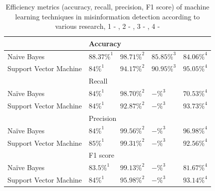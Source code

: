 \documentclass[11pt ,english,a4paper]{article}
\begin{document}
\begin{table}[H]
\centering
\begin{tabular}{lllll}
\cline{2-5}
                       & \multicolumn{4}{|l|}{Accuracy}  \\ [0.5ex]
\hline\hline
\multicolumn{1}{|l|}{Naive Bayes} & \multicolumn{1}{l|}{$88.37\%^{1}$} & \multicolumn{1}{l|}{$98.71\%^{2}$} & \multicolumn{1}{l|}{$85.85\%^{3}$} & \multicolumn{1}{l|}{ $84.06\%^{4}$}\\
\hline
\multicolumn{1}{|l|}{Support Vector Machine}& \multicolumn{1}{l|}{$84\%^{1}$} & \multicolumn{1}{l|}{$94.17\%^{2}$} & \multicolumn{1}{l|}{$90.95\%^{3}$} & \multicolumn{1}{l|}{$95.05\%^{4}$} \\ [1ex]
\hline\hline
\cline{2-5}
                       & \multicolumn{4}{|l|}{Recall}  \\ [0.5ex]
\hline\hline
\multicolumn{1}{|l|}{Naïve Bayes} & \multicolumn{1}{l|}{$84\%^{1}$} & \multicolumn{1}{l|}{$98.70\%^{2}$} & \multicolumn{1}{l|}{$-\%^{3}$} & \multicolumn{1}{l|}{ $70.53\%^{4}$}\\
\hline
\multicolumn{1}{|l|}{Support Vector Machine}& \multicolumn{1}{l|}{$84\%^{1}$} & \multicolumn{1}{l|}{$92.87\%^{2}$} & \multicolumn{1}{l|}{$-\%^{3}$} & \multicolumn{1}{l|}{$93.73\%^{4}$} \\ [1ex]
\hline\hline
\cline{2-5}
                       & \multicolumn{4}{|l|}{Precision}  \\ [0.5ex]
\hline\hline
\multicolumn{1}{|l|}{Naïve Bayes} & \multicolumn{1}{l|}{$84\%^{1}$} & \multicolumn{1}{l|}{$99.56\%^{2}$} & \multicolumn{1}{l|}{$-\%^{3}$} & \multicolumn{1}{l|}{ $96.98\%^{4}$}\\
\hline
\multicolumn{1}{|l|}{Support Vector Machine}& \multicolumn{1}{l|}{$85\%^{1}$} & \multicolumn{1}{l|}{$99.31\%^{2}$} & \multicolumn{1}{l|}{$-\%^{3}$} & \multicolumn{1}{l|}{$92.56\%^{4}$} \\ [1ex]
\hline\hline
\cline{2-5}
                       & \multicolumn{4}{|l|}{F1 score}  \\ [0.5ex]
\hline\hline
\multicolumn{1}{|l|}{Naïve Bayes} & \multicolumn{1}{l|}{$83.5\%^{1}$} & \multicolumn{1}{l|}{$99.13\%^{2}$} & \multicolumn{1}{l|}{$-\%^{3}$} & \multicolumn{1}{l|}{ $81.67\%^{4}$}\\
\hline
\multicolumn{1}{|l|}{Support Vector Machine}& \multicolumn{1}{l|}{$84\%^{1}$} & \multicolumn{1}{l|}{$95.98\%^{2}$} & \multicolumn{1}{l|}{$-\%^{3}$} & \multicolumn{1}{l|}{$93.14\%^{4}$} \\ [1ex]
\hline\hline
\end{tabular}
\caption{\centering Efficiency metrics (accuracy, recall, precision, F1 score) of machine learning techniques in misinformation detection according to various research, 1 - \cite{chap22unmask}, 2 - \cite{bar21health}, 3 - \cite{pod19mach}, 4 - \cite{sha20mach}}
\label{table:results}
\end{table}
\end{document}
